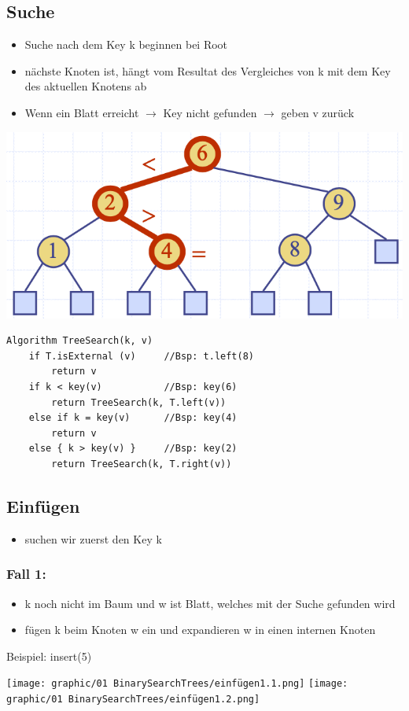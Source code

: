 \subsection{Suche}
\begin{itemize}
    \item Suche nach dem Key k beginnen bei Root
    \item nächste Knoten ist, hängt vom Resultat des Vergleiches von k mit dem Key des aktuellen Knotens ab
    \item Wenn ein Blatt erreicht $\rightarrow$ Key nicht gefunden $\rightarrow$ geben v zurück
\end{itemize}
\begin{center}
    \vspace{-8pt}
    \includegraphics[scale=.3]{graphic/01 BinarySearchTrees/suche.png}
\end{center}
\begin{lstlisting}
Algorithm TreeSearch(k, v)
    if T.isExternal (v)     //Bsp: t.left(8)
        return v
    if k < key(v)           //Bsp: key(6)
        return TreeSearch(k, T.left(v))
    else if k = key(v)      //Bsp: key(4)
        return v
    else { k > key(v) }     //Bsp: key(2)
        return TreeSearch(k, T.right(v))
\end{lstlisting}

\subsection{Einfügen}
\begin{itemize}
    \item suchen wir zuerst den Key k
\end{itemize}
\subsubsection{Fall 1:}
\begin{itemize}
    \item k noch nicht im Baum und w ist Blatt, welches mit der Suche gefunden wird
    \item fügen k beim Knoten w ein und expandieren w in einen internen Knoten
\end{itemize}
Beispiel: insert(5)
\vspace{-8pt}
\begin{multicols}{2}
    \texttt{[image: graphic/01 BinarySearchTrees/einfügen1.1.png]}
    \texttt{[image: graphic/01 BinarySearchTrees/einfügen1.2.png]}
\end{multicols}
\vspace{-8pt}

